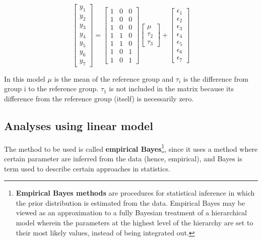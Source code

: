 \documentclass[oneside, a4paper, 11pt]{book}
\begin{document}
$$
\begin{bmatrix}
    y_1 \\ y_2 \\ y_3 \\ y_4 \\ y_5 \\ y_6 \\ y_7
\end{bmatrix} = 
\begin{bmatrix}
    1 &0 &0 \\1 &0  &0 \\ 1 & 0 & 0 \\ 1 & 1 & 0 \\ 1 & 1 & 0 \\ 1 & 0 & 1 \\ 1  & 0 & 1
\end{bmatrix}
\begin{bmatrix}
    \mu \\  \tau_2 \\ \tau_3
\end{bmatrix} +
\begin{bmatrix} 
    \epsilon_1 \\ \epsilon_2 \\ \epsilon_3 \\ \epsilon_4 \\ \epsilon_5 \\ \epsilon_6 \\ \epsilon_7
\end{bmatrix}
$$

In this model $\mu$ is the mean of the reference group and $\tau_i$ is the difference from group i to the reference group. $\tau_1$ is not included in the matrix because its difference from the reference group (itself) is necessarily zero.

\subsection{Analyses using linear model}
The method to be used is called \textbf{empirical Bayes}\footnote{\textbf{Empirical Bayes methods} are procedures for statistical inference in which the prior distribution is estimated from the data. Empirical Bayes may be viewed as an approximation to a fully Bayesian treatment of a hierarchical model wherein the parameters at the highest level of the hierarchy are set to their most likely values, instead of being integrated out.}, since it uses a method where certain parameter are inferred from the data (hence, empirical), and Bayes is term used to describe certain approaches in statistics.
\end{document}
